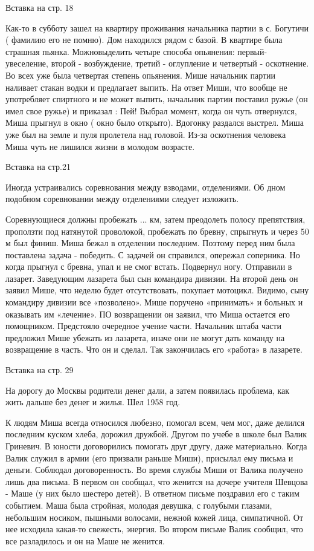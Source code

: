 ﻿Вставка на стр. 18

Как-то в субботу зашел на квартиру проживания начальника партии в с. Богутичи ( фамилию его не помню). Дом находился рядом с базой. В квартире была страшная пьянка. Можновыделить четыре способа опьянения: первый-увеселение, второй - возбуждение, третий - оглупление и четвертый - оскотнение. Во всех уже была четвертая степень опьянения. Мише начальник партии наливает  стакан водки и предлагает выпить. На ответ Миши, что вообще не употребляет спиртного и не может выпить, начальник партии поставил ружье (он имел свое ружье) и приказал : Пей! Выбрал момент, когда он чуть отвернулся, Миша прыгнул в окно ( окно было открыто). Вдогонку раздался выстрел. Миша уже был на земле и пуля пролетела над головой. Из-за оскотнения человека Миша чуть не лишился жизни в молодом возрасте.

Вставка на стр.21 

Иногда устраивались соревнования между взводами, отделениями. Об дном подобном соревновании между отделениями следует изложить.

Соревнующиеся должны пробежать ... км, затем преодолеть полосу препятствия, проползти под натянутой проволокой, пробежать по бревну, спрыгнуть и через 50 м был финиш. Миша бежал в отделении последним. Поэтому перед ним была поставлена задача - победить. С задачей он справился, опережал соперника. Но когда прыгнул с бревна, упал и не смог встать. Подвернул ногу. Отправили в лазарет. Заведующим лазарета был сын командира дивизии. На второй день он заявил Мише, что неделю будет отсутствовать, покупает мотоцикл. Видимо, сыну командиру дивизии все «позволено». Мише поручено «принимать» и больных и оказывать им «лечение». ПО возвращении он заявил, что Миша остается его помощником. Предстояло очередное учение части. Начальник штаба части предложил Мише убежать из лазарета, иначе они не могут дать команду на возвращение в часть. Что он и сделал. Так закончилась его «работа» в лазарете.

Вставка на стр. 29

На дорогу до Москвы родители денег дали, а затем появилась проблема, как жить дальше без денег и жилья. Шел 1958 год.

К людям Миша всегда относился любезно, помогал всем, чем мог, даже делился последним куском хлеба, дорожил дружбой. Другом по учебе в школе был Валик Гриневич. В юности договорились помогать друг другу,  даже материально. Когда Валик служил  в армии (его призвали раньше Миши), присылал ему письма и деньги. Соблюдал договоренность. Во время службы Миши от Валика получено лишь два письма. В первом он сообщал, что женится на дочере учителя Шевцова - Маше (у них было шестеро детей). В ответном письме поздравил его с таким событием. Маша была стройная, молодая девушка, с голубыми глазами, небольшим носиком, пышными волосами, нежной кожей лица, симпатичной. От нее исходила какая-то свежесть, энергия. Во втором письме Валик сообщил, что все разладилось и он на Маше не женится.

